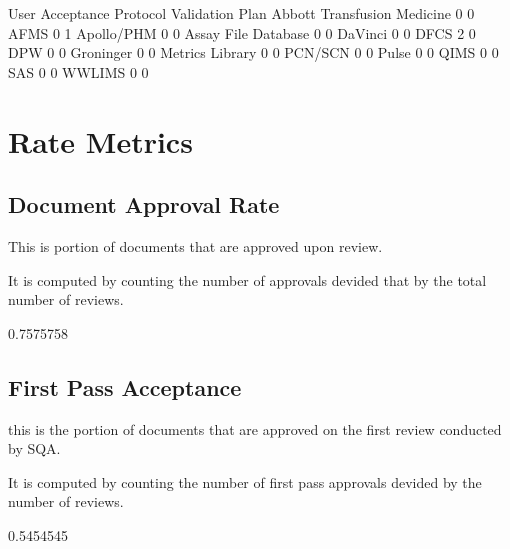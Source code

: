 \documentclass{article}
\begin{document}
\begin{Schunk}
\begin{Soutput}
                              User Acceptance Protocol Validation Plan
  Abbott Transfusion Medicine                        0               0
  AFMS                                               0               1
  Apollo/PHM                                         0               0
  Assay File Database                                0               0
  DaVinci                                            0               0
  DFCS                                               2               0
  DPW                                                0               0
  Groninger                                          0               0
  Metrics Library                                    0               0
  PCN/SCN                                            0               0
  Pulse                                              0               0
  QIMS                                               0               0
  SAS                                                0               0
  WWLIMS                                             0               0
\end{Soutput}
\end{Schunk}
\section{Rate Metrics}
\subsection{Document Approval Rate}
This is portion of documents that are approved upon review.

It is computed by counting the number of approvals devided that by the total number of reviews.

\begin{Schunk}
\begin{Soutput}
[1] 0.7575758
\end{Soutput}
\end{Schunk}

\subsection{First Pass Acceptance}
this is the portion of documents that are approved on the first review conducted
by SQA.

It is computed by counting the number of first pass approvals devided by
the number of reviews.

\begin{Schunk}
\begin{Soutput}
[1] 0.5454545
\end{Soutput}
\end{Schunk}
\end{document}
